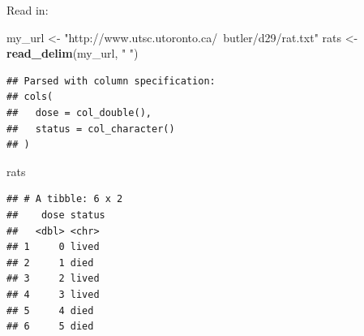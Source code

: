 \documentclass[
  ignorenonframetext,
]{beamer}
\newenvironment{Shaded}{\begin{snugshade}}{\end{snugshade}}
\newcommand{\KeywordTok}[1]{\textcolor[rgb]{0.13,0.29,0.53}{\textbf{#1}}}
\newcommand{\NormalTok}[1]{#1}
\newcommand{\StringTok}[1]{\textcolor[rgb]{0.31,0.60,0.02}{#1}}
\begin{document}
\begin{frame}[fragile]{Read in:}
\protect\hypertarget{read-in}{}

\begin{Shaded}
\begin{Highlighting}[]
\NormalTok{my_url <-}\StringTok{ "http://www.utsc.utoronto.ca/~butler/d29/rat.txt"}
\NormalTok{rats <-}\StringTok{ }\KeywordTok{read_delim}\NormalTok{(my_url, }\StringTok{" "}\NormalTok{)}
\end{Highlighting}
\end{Shaded}

\begin{verbatim}
## Parsed with column specification:
## cols(
##   dose = col_double(),
##   status = col_character()
## )
\end{verbatim}

\begin{Shaded}
\begin{Highlighting}[]
\NormalTok{rats}
\end{Highlighting}
\end{Shaded}

\begin{verbatim}
## # A tibble: 6 x 2
##    dose status
##   <dbl> <chr> 
## 1     0 lived 
## 2     1 died  
## 3     2 lived 
## 4     3 lived 
## 5     4 died  
## 6     5 died
\end{verbatim}

\end{frame}
\end{document}
